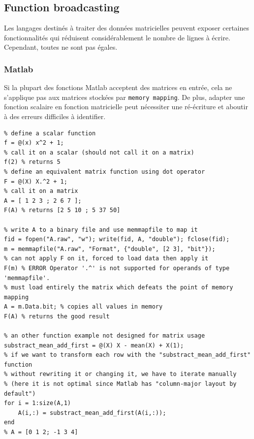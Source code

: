 


\subsection{Function broadcasting}

Les langages destinés à traiter des données matricielles peuvent exposer certaines fonctionnalités qui réduisent considérablement le nombre de lignes à écrire. Cependant, toutes ne sont pas égales.

\subsubsection{Matlab}

Si la plupart des fonctions Matlab acceptent des matrices en entrée, cela ne s'applique pas aux matrices stockées par \verb|memory mapping|. De plus, adapter une fonction scalaire en fonction matricielle peut nécessiter une ré-écriture et aboutir à des erreurs difficiles à identifier.


\matlabstyle
\begin{lstlisting}
% define a scalar function
f = @(x) x^2 + 1;
% call it on a scalar (should not call it on a matrix)
f(2) % returns 5
% define an equivalent matrix function using dot operator
F = @(X) X.^2 + 1;
% call it on a matrix
A = [ 1 2 3 ; 2 6 7 ];
F(A) % returns [2 5 10 ; 5 37 50]

% write A to a binary file and use memmapfile to map it
fid = fopen("A.raw", "w"); write(fid, A, "double"); fclose(fid);
m = memmapfile("A.raw", "Format", {"double", [2 3], "bit"});
% can not apply F on it, forced to load data then apply it
F(m) % ERROR Operator '.^' is not supported for operands of type 'memmapfile'.
% must load entirely the matrix which defeats the point of memory mapping
A = m.Data.bit; % copies all values in memory
F(A) % returns the good result

% an other function example not designed for matrix usage
substract_mean_add_first = @(X) X - mean(X) + X(1);
% if we want to transform each row with the "substract_mean_add_first" function
% without rewriting it or changing it, we have to iterate manually
% (here it is not optimal since Matlab has "column-major layout by default")
for i = 1:size(A,1)
    A(i,:) = substract_mean_add_first(A(i,:));
end
% A = [0 1 2; -1 3 4]
\end{lstlisting}

